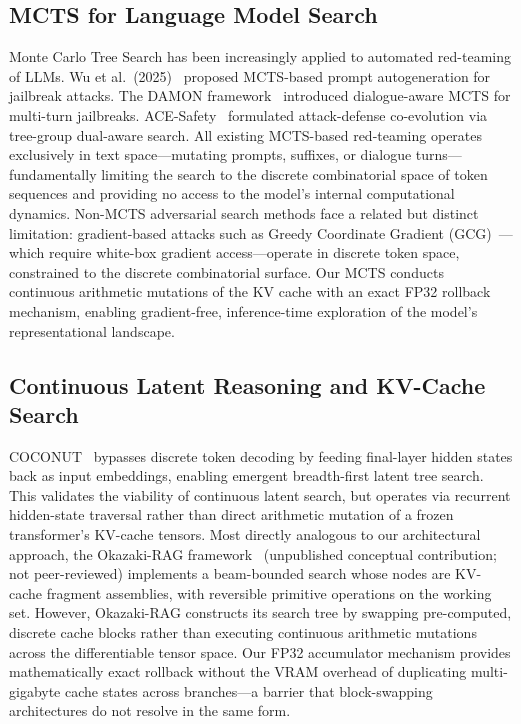 \subsection{MCTS for Language Model Search}\label{sec:appendix-mcts-lm}
Monte Carlo Tree Search has been increasingly applied to automated red-teaming of LLMs. Wu et al.\ (2025)~\cite{wu2025mcts} proposed MCTS-based prompt autogeneration for jailbreak attacks. The DAMON framework~\cite{damon2025} introduced dialogue-aware MCTS for multi-turn jailbreaks. ACE-Safety~\cite{li2025ace} formulated attack-defense co-evolution via tree-group dual-aware search. All existing MCTS-based red-teaming operates exclusively in text space---mutating prompts, suffixes, or dialogue turns---fundamentally limiting the search to the discrete combinatorial space of token sequences and providing no access to the model's internal computational dynamics. Non-MCTS adversarial search methods face a related but distinct limitation: gradient-based attacks such as Greedy Coordinate Gradient (GCG)~\cite{zou2023gcg}---which require white-box gradient access---operate in discrete token space, constrained to the discrete combinatorial surface. Our MCTS conducts continuous arithmetic mutations of the KV cache with an exact FP32 rollback mechanism, enabling gradient-free, inference-time exploration of the model's representational landscape.

\subsection{Continuous Latent Reasoning and KV-Cache Search}\label{sec:appendix-continuous-latent}
COCONUT~\cite{hao2025coconut} bypasses discrete token decoding by feeding final-layer hidden states back as input embeddings, enabling emergent breadth-first latent tree search. This validates the viability of continuous latent search, but operates via recurrent hidden-state traversal rather than direct arithmetic mutation of a frozen transformer's KV-cache tensors. Most directly analogous to our architectural approach, the Okazaki-RAG framework~\cite{okazakirag2025} (unpublished conceptual contribution; not peer-reviewed) implements a beam-bounded search whose nodes are KV-cache fragment assemblies, with reversible primitive operations on the working set. However, Okazaki-RAG constructs its search tree by swapping pre-computed, discrete cache blocks rather than executing continuous arithmetic mutations across the differentiable tensor space. Our FP32 accumulator mechanism provides mathematically exact rollback without the VRAM overhead of duplicating multi-gigabyte cache states across branches---a barrier that block-swapping architectures do not resolve in the same form.

